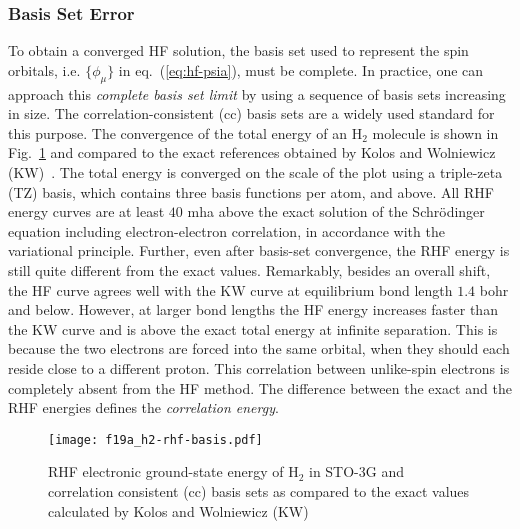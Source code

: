 \subsubsection{Basis Set Error}

To obtain a converged HF solution, the basis set used to represent the spin orbitals, i.e. $\{\phi_\mu\}$ in eq.~(\ref{eq:hf-psia}), must be complete.
In practice, one can approach this \textit{complete basis set limit} by using a sequence of basis sets increasing in size.
The correlation-consistent (cc) basis sets are a widely used standard for this purpose.
The convergence of the total energy of an H$_2$ molecule is shown in Fig.~\ref{fig:hf-h2} and compared to the exact references obtained by Kolos and Wolniewicz (KW)~\cite{Kolos1964}.
The total energy is converged on the scale of the plot using a triple-zeta (TZ) basis, which contains three basis functions per atom, and above.
All RHF energy curves are at least $40$ mha above the exact solution of the Schr\"odinger equation including electron-electron correlation, in accordance with the variational principle.
Further, even after basis-set convergence, the RHF energy is still quite different from the exact values.
Remarkably, besides an overall shift, the HF curve agrees well with the KW curve at equilibrium bond length $1.4$ bohr and below.
However, at larger bond lengths the HF energy increases faster than the KW curve and is above the exact total energy at infinite separation.
This is because the two electrons are forced into the same orbital, when they should each reside close to a different proton.
This correlation between unlike-spin electrons is completely absent from the HF method.
The difference between the exact and the RHF energies defines the \textit{correlation energy}.

\begin{figure}[h]
\centering
\texttt{[image: f19a\_h2-rhf-basis.pdf]}
\caption{RHF electronic ground-state energy of H$_2$ in STO-3G and correlation consistent (cc) basis sets as compared to the exact values calculated by Kolos and Wolniewicz (KW)~\cite{Kolos1964}}
\label{fig:hf-h2}
\end{figure}

